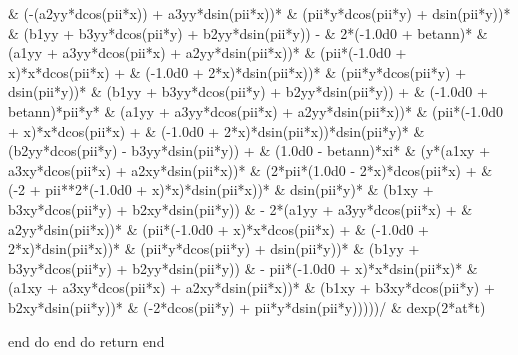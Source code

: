 \begin{fortrancode}[caption={Termos fontes}, label={cod:fortran-diffeq_2}]
     &     (-(a2yy*dcos(pii*x)) + a3yy*dsin(pii*x))*
     &     (pii*y*dcos(pii*y) + dsin(pii*y))*
     &     (b1yy + b3yy*dcos(pii*y) + b2yy*dsin(pii*y)) - 
     &    2*(-1.0d0 + betann)*
     &     (a1yy + a3yy*dcos(pii*x) + a2yy*dsin(pii*x))*
     &     (pii*(-1.0d0 + x)*x*dcos(pii*x) + 
     &       (-1.0d0 + 2*x)*dsin(pii*x))*
     &     (pii*y*dcos(pii*y) + dsin(pii*y))*
     &     (b1yy + b3yy*dcos(pii*y) + b2yy*dsin(pii*y)) + 
     &    (-1.0d0 + betann)*pii*y*
     &     (a1yy + a3yy*dcos(pii*x) + a2yy*dsin(pii*x))*
     &     (pii*(-1.0d0 + x)*x*dcos(pii*x) + 
     &       (-1.0d0 + 2*x)*dsin(pii*x))*dsin(pii*y)*
     &     (b2yy*dcos(pii*y) - b3yy*dsin(pii*y)) + 
     &    (1.0d0 - betann)*xi*
     &     (y*(a1xy + a3xy*dcos(pii*x) + a2xy*dsin(pii*x))*
     &        (2*pii*(1.0d0 - 2*x)*dcos(pii*x) + 
     &          (-2 + pii**2*(-1.0d0 + x)*x)*dsin(pii*x))*
     &        dsin(pii*y)*
     &        (b1xy + b3xy*dcos(pii*y) + b2xy*dsin(pii*y)) 
     &        - 2*(a1yy + a3yy*dcos(pii*x) + 
     &          a2yy*dsin(pii*x))*
     &        (pii*(-1.0d0 + x)*x*dcos(pii*x) + 
     &          (-1.0d0 + 2*x)*dsin(pii*x))*
     &        (pii*y*dcos(pii*y) + dsin(pii*y))*
     &        (b1yy + b3yy*dcos(pii*y) + b2yy*dsin(pii*y)) 
     &        - pii*(-1.0d0 + x)*x*dsin(pii*x)*
     &        (a1xy + a3xy*dcos(pii*x) + a2xy*dsin(pii*x))*
     &        (b1xy + b3xy*dcos(pii*y) + b2xy*dsin(pii*y))*
     &        (-2*dcos(pii*y) + pii*y*dsin(pii*y)))))/
     &  dexp(2*at*t)
     

        end do  
      end do  
      return
      end
\end{fortrancode}
